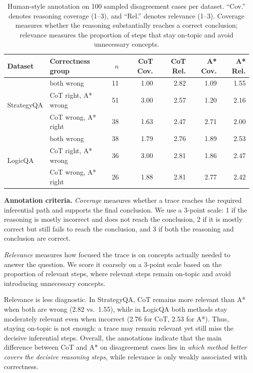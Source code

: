 \documentclass[11pt]{article}
\begin{document}
\begin{table}[t]
\centering
\small
\begin{tabular}{llrrrrr}
\toprule
Dataset & Correctness group & $n$ & CoT Cov. & CoT Rel. & A* Cov. & A* Rel. \\
\midrule
\multirow{3}{*}{StrategyQA}
& both wrong            & 11 & 1.00 & 2.82 & 1.09 & 1.55 \\
& CoT right, A* wrong   & 51 & 3.00 & 2.57 & 1.20 & 2.16 \\
& CoT wrong, A* right   & 38 & 1.63 & 2.47 & 2.71 & 2.00 \\
\midrule
\multirow{3}{*}{LogicQA}
& both wrong            & 38 & 1.79 & 2.76 & 1.89 & 2.53 \\
& CoT right, A* wrong   & 36 & 3.00 & 2.81 & 1.86 & 2.47 \\
& CoT wrong, A* right   & 26 & 1.88 & 2.81 & 2.77 & 2.42 \\
\bottomrule
\end{tabular}
\caption{Human-style annotation on 100 sampled disagreement cases per dataset. “Cov.” denotes reasoning coverage (1--3), and “Rel.” denotes relevance (1--3). Coverage measures whether the reasoning substantially reaches a correct conclusion; relevance measures the proportion of steps that stay on-topic and avoid unnecessary concepts.}
\label{tab:disagreement-human-eval}
\end{table}

\noindent\textbf{Annotation criteria.}\label{annot-crit}
\textit{Coverage} measures whether a trace reaches the required inferential path and supports the final conclusion. We use a 3-point scale: 1 if the reasoning is mostly incorrect and does not reach the conclusion, 2 if it is mostly correct but still fails to reach the conclusion, and 3 if both the reasoning and conclusion are correct.

\noindent\textit{Relevance} measures how focused the trace is on concepts actually needed to answer the question. We score it coarsely on a 3-point scale based on the proportion of relevant steps, where relevant steps remain on-topic and avoid introducing unnecessary concepts.

\noindent Relevance is less diagnostic. In StrategyQA, CoT remains more relevant than A* when both are wrong (2.82 vs.\ 1.55), while in LogicQA both methods stay moderately relevant even when incorrect (2.76 for CoT, 2.53 for A*). Thus, staying on-topic is not enough: a trace may remain relevant yet still miss the decisive inferential steps. Overall, the annotations indicate that the main difference between CoT and A* on disagreement cases lies in \emph{which method better covers the decisive reasoning steps}, while relevance is only weakly associated with correctness.
\end{document}
